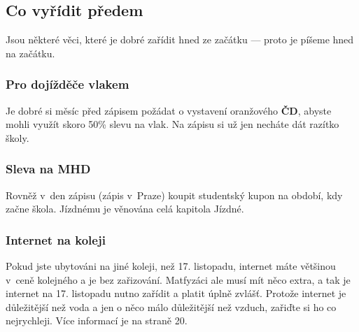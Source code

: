 \subsection{Co vyřídit předem}
Jsou některé věci, které je dobré zařídit hned ze začátku --- proto je píšeme hned na začátku.

\subsubsection{Pro dojížděče vlakem}
Je dobré si měsíc před zápisem požádat o vystavení oranžového {\textbf{ ČD}}, abyste mohli využít skoro 50\% slevu na vlak. Na zápisu si už jen necháte dát razítko školy.

\subsubsection{Sleva na MHD}
Rovněž v~den zápisu (zápis v~Praze) koupit studentský kupon na období, kdy začne škola. Jízdnému je věnována celá kapitola Jízdné.

\subsubsection{Internet na koleji}
Pokud jste ubytováni na jiné koleji, než 17. listopadu, internet máte většinou v~ceně kolejného a je bez zařizování. Matfyzáci ale musí mít něco extra, a tak je internet na 17. listopadu nutno zařídit a platit úplně zvlášť. Protože internet je důležitější než voda a jen o něco málo důležitější než vzduch, zařiďte si ho co nejrychleji. Více informací je na straně 20.
